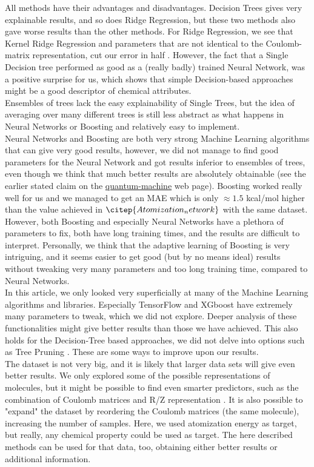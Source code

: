 \documentclass[11pt,a4paper,notitlepage]{article}
\begin{document}
All methods have their advantages and disadvantages. Decision Trees gives very explainable results, and so does Ridge Regression, but these two methods also gave worse results than the other methods. For Ridge Regression, we see that Kernel Ridge Regression and parameters that are not identical to the Coulomb-matrix representation, cut our error in half \citep{Atomization_Ridge}. However, the fact that a Single Decision tree performed as good as a (really badly) trained Neural Network, was a positive surprise for us, which shows that simple Decision-based approaches might be a good descriptor of chemical attributes. \\Ensembles of trees lack the easy explainability of Single Trees, but the idea of averaging over many different trees is still less abstract as what happens in Neural Networks or Boosting and relatively easy to implement. \\ Neural Networks and Boosting are both very strong Machine Learning algorithms that can give very good results, however, we did not manage to find good parameters for the Neural Network and got results inferior to ensembles of trees, even though we think that much better results are absolutely obtainable (see the earlier stated claim on the \href{http://quantum-machine.org/datasets/}{quantum-machine} web page). Boosting worked really well for us and we managed to get an MAE which is only $\approx1.5$ kcal/mol higher than the value achieved in $\citep{Atomization_network}$ with the same dataset. However, both Boosting and especially Neural Networks have a plethora of parameters to fix, both have long training times, and the results are difficult to interpret. Personally, we think that the adaptive learning of Boosting is very intriguing, and it seems easier to get good (but by no means ideal) results without tweaking very many parameters and too long training time, compared to Neural Networks.\\

In this article, we only looked very superficially at many of the Machine Learning algorithms and libraries. Especially TensorFlow and XGboost have extremely many parameters to tweak, which we did not explore. Deeper analysis of these functionalities might give better results than those we have achieved. This also holds for the  Decision-Tree based approaches, we did not delve into options such as Tree Pruning \citep{MortenLectureNotes}. These are some ways to improve upon our results. \\
The dataset is not very big, and it is likely that larger data sets will give even better results. We only explored some of the possible representations of molecules, but it might be possible to find even smarter predictors, such as the combination of Coulomb matrices and R/Z representation \citep{Atomization_network}. It is also possible to "expand" the dataset by reordering the Coulomb matrices (the same molecule), increasing the number of samples. Here, we used atomization energy as target, but really, any chemical property could be used as target. The here described methods can be used for that data, too, obtaining either better results or additional information. 
\end{document}

